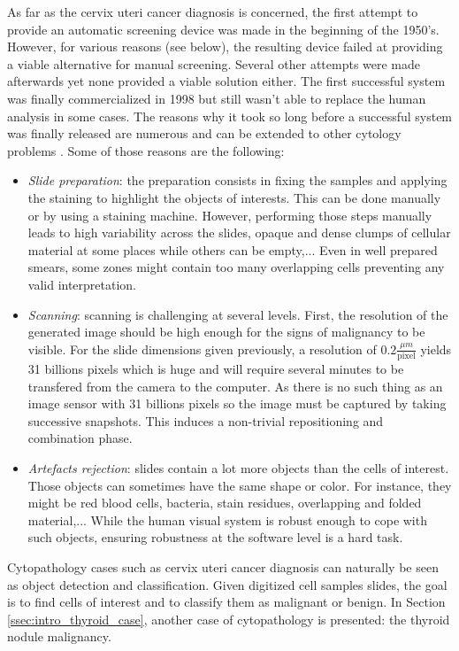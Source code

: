As far as the cervix uteri cancer diagnosis is concerned, the first attempt to provide an automatic screening device was made in the beginning of the 1950's. However, for various reasons (see below), the resulting device failed at providing a viable alternative for manual screening. Several other attempts were made afterwards yet none provided a viable solution either. The first successful system was finally commercialized in 1998 but still wasn't able to replace the human analysis in some cases. The reasons why it took so long before a successful system was finally released are numerous and can be extended to other cytology problems \cite{bengtsson2014screening}. Some of those reasons are the following:

\begin{itemize}
	\item \textit{Slide preparation}: the preparation consists in fixing the samples and applying the staining to highlight the objects of interests. This can be done manually or by using a staining machine. However, performing those steps manually leads to high variability across the slides, opaque and dense clumps of cellular material at some places while others can be empty,... Even in well prepared smears, some zones might contain too many overlapping cells preventing any valid interpretation. 
	\item \textit{Scanning}: scanning is challenging at several levels. First, the resolution of the generated image should be high enough for the signs of malignancy to be visible. For the slide dimensions given previously, a resolution of $0.2 \frac{\mu m}{\text{pixel}}$ yields 31 billions pixels which is huge and will require several minutes to be transfered from the camera to the computer. As there is no such thing as an image sensor with 31 billions pixels so the image must be captured by taking successive snapshots. This induces a non-trivial repositioning and combination phase.
	\item \textit{Artefacts rejection}: slides contain a lot more objects than the cells of interest. Those objects can sometimes have the same shape or color. For instance, they might be red blood cells, bacteria, stain residues, overlapping and folded material,... While the human visual system is robust enough to cope with such objects, ensuring robustness at the software level is a hard task.
\end{itemize}

Cytopathology cases such as cervix uteri cancer diagnosis can naturally be seen as object detection and classification. Given digitized cell samples slides, the goal is to find cells of interest and to classify them as malignant or benign. In Section \ref{ssec:intro_thyroid_case}, another case of cytopathology is presented: the thyroid nodule malignancy. 

